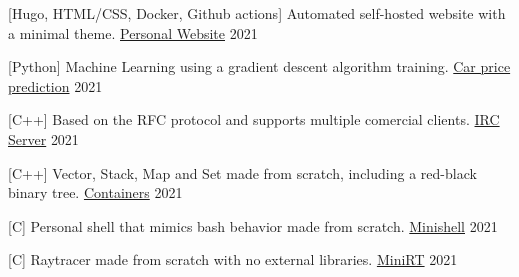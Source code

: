 
\begin{cventries}

  \cventry
    {[Hugo, HTML/CSS, Docker, Github actions] Automated self-hosted website with a minimal theme.}
    {\href{https://github.com/pruiz-ca/pedroruiz.xyz}{Personal Website}}
    {}
    {2021}
    {}

  \cventry
    {[Python] Machine Learning using a gradient descent algorithm training.}
    {\href{https://github.com/pruiz-ca/ft_linear_regression}{Car price prediction}}
    {}
    {2021}
    {}

  \cventry
    {[C++] Based on the RFC protocol and supports multiple comercial clients.}
    {\href{https://github.com/pruiz-ca/ft_irc}{IRC Server}}
    {}
    {2021}
    {}

  \cventry
    {[C++] Vector, Stack, Map and Set made from scratch, including a red-black binary tree.}
    {\href{https://github.com/pruiz-ca/ft_containers}{Containers}}
    {}
    {2021}
    {}

  \cventry
    {[C] Personal shell that mimics bash behavior made from scratch.}
    {\href{https://github.com/pruiz-ca/minishell}{Minishell}}
    {}
    {2021}
    {}

  \cventry
    {[C] Raytracer made from scratch with no external libraries.}
    {\href{https://github.com/pruiz-ca/miniRT}{MiniRT}}
    {}
    {2021}
    {}

\end{cventries}
